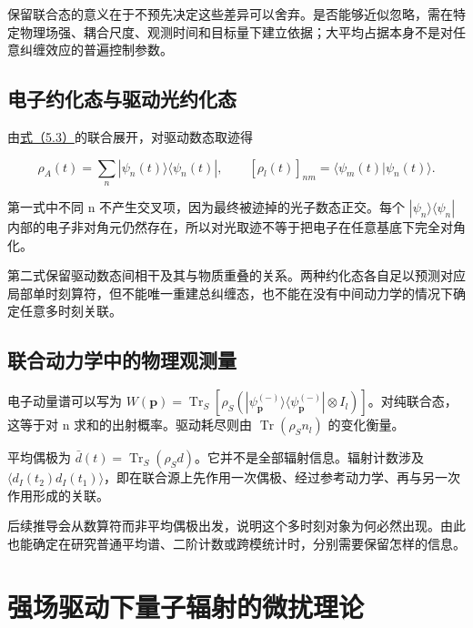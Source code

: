 \documentclass[UTF8,a4paper,zihao=-4,openany,fontset=fandol]{ctexbook}
\begin{document}
保留联合态的意义在于不预先决定这些差异可以舍弃。是否能够近似忽略，需在特定物理场强、耦合尺度、观测时间和目标量下建立依据；大平均占据本身不是对任意纠缠效应的普遍控制参数。



\section{电子约化态与驱动光约化态}\label{sec:05:8}


由\hyperref[eq:5.3]{式（5.3）}的联合展开，对驱动数态取迹得



\begin{equation*}
\rho_A(t)=\sum_n|\psi_n(t)\rangle\langle\psi_n(t)|,
\qquad [\rho_l(t)]_{nm}=\langle\psi_m(t)|\psi_n(t)\rangle.
\tag{5.5}\label{eq:5.5}
\end{equation*}


第一式中不同 n 不产生交叉项，因为最终被迹掉的光子数态正交。每个 $|\psi_n\rangle\langle\psi_n|$ 内部的电子非对角元仍然存在，所以对光取迹不等于把电子在任意基底下完全对角化。



第二式保留驱动数态间相干及其与物质重叠的关系。两种约化态各自足以预测对应局部单时刻算符，但不能唯一重建总纠缠态，也不能在没有中间动力学的情况下确定任意多时刻关联。



\section{联合动力学中的物理观测量}\label{sec:05:9}


电子动量谱可以写为 $W(\mathbf p)=\operatorname{Tr}_S[\rho_S(|\psi_{\mathbf p}^{(-)}\rangle\langle\psi_{\mathbf p}^{(-)}|\otimes I_l)]$。对纯联合态，这等于对 n 求和的出射概率。驱动耗尽则由 $\operatorname{Tr}(\rho_Sn_l)$ 的变化衡量。



平均偶极为 $\bar d(t)=\operatorname{Tr}_S(\rho_Sd)$。它并不是全部辐射信息。辐射计数涉及 $\langle d_I(t_2)d_I(t_1)\rangle$，即在联合源上先作用一次偶极、经过参考动力学、再与另一次作用形成的关联。



后续推导会从数算符而非平均偶极出发，说明这个多时刻对象为何必然出现。由此也能确定在研究普通平均谱、二阶计数或跨模统计时，分别需要保留怎样的信息。



\chapter{强场驱动下量子辐射的微扰理论}\label{ch:06}
\end{document}
